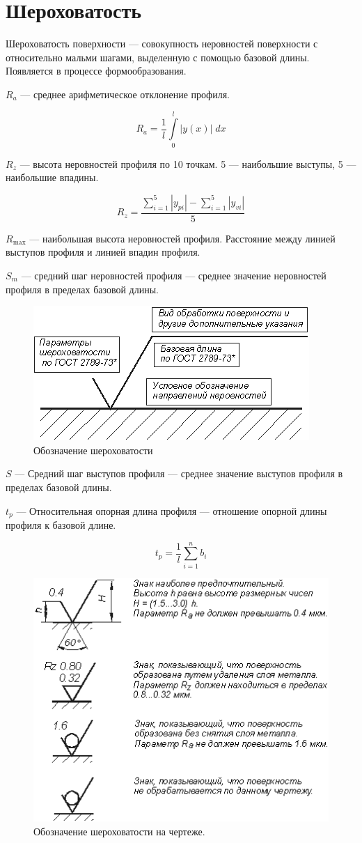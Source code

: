 \section{Шероховатость}

Шероховатость поверхности --- совокупность неровностей поверхности с относительно мальми шагами, выделенную с помощью базовой длины. Появляется в процессе формообразования.

$R_a$ --- среднее арифметическое отклонение профиля.

\[ R_a = \dfrac{1}{l} \int\limits_0^l |y(x)| \; dx \]

$R_z$ --- высота неровностей профиля по 10 точкам. 5 --- наибольшие выступы, 5 --- наибольшие впадины.

\[ R_z = \dfrac{\sum\limits_{i=1}^5 |y_{pi}| - \sum\limits_{i=1}^5 |y_{vi}|}{5} \]

$R_{\max}$ --- наибольшая высота неровностей профиля. Расстояние между линией выступов профиля и линией впадин профиля.

$S_m$ --- средний шаг неровностей профиля --- среднее значение неровностей профиля в пределах базовой длины.

\begin{figure}
	\centering
	\includegraphics[width=0.7\linewidth]{pic/1_5}
	\caption{Обозначение шероховатости}
	\label{fig:15}
\end{figure}


$S$ --- Средний шаг выступов профиля --- среднее значение выступов профиля в пределах базовой длины.

$t_p$ --- Относительная опорная длина профиля --- отношение опорной длины профиля к базовой длине.

\[ t_p = \dfrac{1}{l} \sum\limits_{i=1}^n b_i \]

\begin{figure}
	\centering
	\includegraphics[width=0.7\linewidth]{pic/1_6}
	\caption{Обозначение шероховатости на чертеже.}
	\label{fig:16}
\end{figure}


